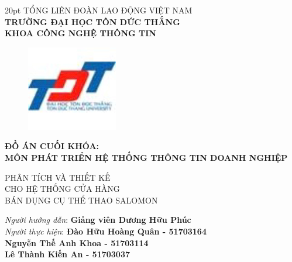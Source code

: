 \documentclass{article}
\begin{document}
\newcommand{\xfill}[2][1ex]{{%
  \dimen0=#2\advance\dimen0 by #1
  \leaders\hrule height \dimen0 depth -#1\hfill%
}}

\begin{center}
    
    \fontsize{14pt} {20pt}\selectfont
    \textsc{TỔNG LIÊN ĐOÀN LAO ĐỘNG VIỆT NAM\\}
    \textbf{TRƯỜNG ĐẠI HỌC TÔN DỨC THẮNG\\}
    \textbf{KHOA CÔNG NGHỆ THÔNG TIN\\}
    \vspace{1 cm}
    
        \begin{figure}[htp]
            \centering
           \includegraphics{2.jpg}
        \end{figure}
     
     
     
    \fontsize{16}{20}\selectfont\textbf{ĐỒ ÁN CUỐI KHÓA:\\}
    \fontsize{16}{20}\selectfont\textbf{MÔN PHÁT TRIỂN HỆ THỐNG THÔNG TIN DOANH NGHIỆP\\}
    \vspace{0.5CM}
    
    \fontsize{24}{20}\selectfont\textsc{PHÂN TÍCH VÀ THIẾT KẾ\\ CHO HỆ THỐNG CỬA HÀNG \\BÁN DỤNG CỤ THỂ THAO SALOMON \\}
    \end{center}
    \vspace{2cm}
    \begin{flushright}
        \fontsize{14}{20}\selectfont
        \textit{Người hướng dẫn}: \textbf{Giảng viên Dương Hữu Phúc}\\
        \textit{Người thực hiện}: \textbf{Đào Hữu Hoàng Quân - 51703164}\\
        \textbf{Nguyễn Thế Anh Khoa - 51703114}\\
         \textbf{Lê Thành Kiến An - 51703037}\\
    \end{flushright}
\end{document}

